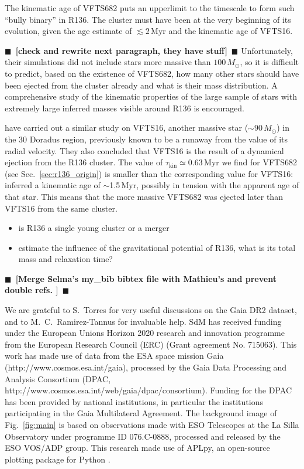 \documentclass[apjl,twocolumn]{emulateapj}
\newcommand{\todo}[1]{{\large $\blacksquare$~\textbf{\color{red}[#1]}}~$\blacksquare$}
\newcommand{\SdM}[1]{{{\color{Sepia}{#1}}}}
\renewcommand{\SdM}[1]{{{{#1}}}}
\DeclareRobustCommand{\Figref}[1]{Fig.~\ref{#1}}
\DeclareRobustCommand{\Secref}[1]{Sec.~\ref{#1}}
\begin{document}
The kinematic age of VFTS682 puts an
upperlimit to the timescale to form such ``bully binary'' in
R136. The cluster must have been at the very beginning of its
evolution, given the age estimate of $\lesssim 2$\,Myr
\cite{crowther:10,sabbi:12} and the kinematic age of VFTS16.

\todo{check \cite{banerjee} and rewrite next paragraph, they
  have stuff} Unfortunately, their simulations did not include stars more
massive than $100\,M_\odot$, so it is difficult to predict, based on
the existence of VFTS682, how many other stars should have been
ejected from the cluster already and what is their mass
distribution. A comprehensive study of the kinematic properties of the
large sample of stars with extremely large inferred masses visible
around R136 is encouraged.  

\cite{lennon:18} have carried out a similar study on VFTS16, another
massive star ($\sim90\,M_\odot$) in the 30 Doradus region, previously
known to be a runaway from the value of
its radial velocity. They also concluded that VFTS16 is 
the result of a dynamical ejection from the R136 cluster. 
The value of $\tau_\mathrm{kin}\simeq0.63$\,Myr we find for VFTS682 (see \Secref{sec:r136_origin}) is smaller
than the corresponding value for VFTS16: \cite{lennon:18} inferred a kinematic age of
$\sim$1.5\,Myr, possibly in tension with the apparent age of that star. This means that the more
massive VFTS682 was ejected later than VFTS16 from the same cluster.



\begin{itemize}
\item is R136 a single young cluster or a merger
\item estimate the influence of the gravitational potential of R136,
  what is its total mass and relaxation time?
\end{itemize}


\todo{Merge Selma's my\_bib bibtex file with Mathieu's and prevent double refs. }



\begin{acknowledgements}
  We are grateful to S.~Torres for 
  very useful discussions on the
  Gaia DR2 dataset, and to M.~C.~Ramirez-Tannus for invaluable help.
  \SdM{SdM has received funding under the European Unions Horizon 2020 research and innovation programme from the European Research
Council (ERC) (Grant agreement No. 715063).
   This work has made use of data from the ESA space mission Gaia (http://www.cosmos.esa.int/gaia), processed by the Gaia Data Processing and Analysis Consortium (DPAC, http://www.cosmos.esa.int/web/gaia/dpac/consortium). Funding for the DPAC has been provided by national institutions, in particular the institutions participating in the Gaia Multilateral Agreement. }
  The background image of \Figref{fig:main} is based on observations
  made with ESO Telescopes at the La Silla Observatory under programme
  ID 076.C-0888, processed and released by the ESO VOS/ADP group.
  This research made use of APLpy, an open-source plotting package for Python \citep[][]{robitaille:12}.
\end{acknowledgements}
\end{document}
